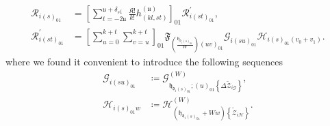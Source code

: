 \begin{align}
\bm{\mathcal{R}}_{i\left(s\right)_{01}}
    &=
        \left[
            \sum_{t=-2\mathfrak{u}}^{\mathfrak{u}+\delta_{s\bar{1}}}
            \frac{\mathfrak{K}!}{k!}
            h^{\left(\mathfrak{u}\right)}_{\left(kl,st\right)}
        \right]_{01}
        \mathcal{R}_{i\left(st\right)_{01}}^{\prime}
,\\
\mathcal{R}_{i\left(st\right)_{01}}^{\prime}
    &=
        \left[
            \sum_{u=0}^{k+t}
            \sum_{v=u}^{k+t}
        \right]_{01}
        \mathfrak{F}
        _{
            \left(
                \frac{\mathfrak{h}_{\mathfrak{d}_{i}\left(s\right)_{01}}}{W}
            \right)
            \left(uv\right)_{01}
        }
        \bm{\mathcal{G}}_{i\left(su\right)_{01}}
        \bm{\mathcal{H}}_{i\left(s\right)_{01}\left(v_{0}+v_{1}\right)}
.
\end{align}
where we found it convenient to introduce the following sequences
\begin{align}
\bm{\mathcal{G}}_{i\left(su\right)_{01}}
    &\coloneqq
        \mathcal{G}
        _{
            \mathfrak{h}_{\mathfrak{d}_{i}\left(s\right)_{01}};
            \left(u\right)_{01}
            \left\{\Delta\tilde{\mathcal{Z}}_{i\mathcal{G}}\right\}
        }
        ^{\left(W\right)}
\label{definition:G-array}
,\\
\bm{\mathcal{H}}_{i\left(s\right)_{01}w}
    &\coloneqq
        \mathcal{H}_{
            \left(
                \mathfrak{h}_{\mathfrak{d}_{i}\left(s\right)_{01}}
                +Ww
            \right)
            \left\{\tilde{\mathcal{Z}}_{i\mathcal{H}}\right\}
        }^{\left(W\right)}
\label{definition:H-array}
.
\end{align}

